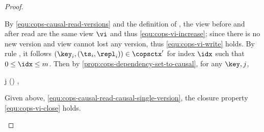 \begin{proof}
\begin{enumerate}
\begin{enumerate}
        By \cref{equ:cops-causal-read-versions} and the definition of \COPSViews, 
        the view before and after read are the same view \( \vi \) and thus \cref{equ:cops-vi-increase};
        since there is no new version and view cannot lost any version, thus \cref{equ:cops-vi-write} holds.
        By rule \rCOPSFinishRead, it follows \((\key_i,(\ts_i,\repl_i)) \in \copsctx' \) for index \( \idx \)
        such that \( 0 \leq \idx \leq m \).
        Then by \cref{prop:cops-dependency-set-to-causal}, for any \( \key, j \),
        \begin{Formulae}
        \begin{Formula}
         \implies j \in \vi(\key) ,
        \label{equ:cops-causal-read-causal-single-version}
        \end{Formula}
        \end{Formulae}
        Given above, \cref{equ:cops-causal-read-causal-single-version},
        the closure property \cref{equ:cops-vi-close} holds. \qedhere
    \end{enumerate}
\end{enumerate}
\end{proof}

